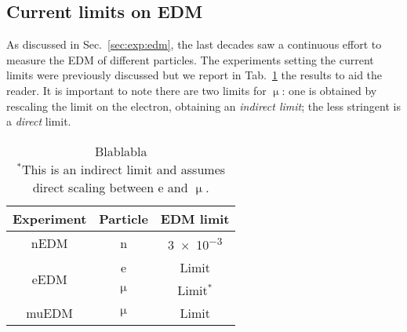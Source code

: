 \begin{refsection}
    \subsection{Current limits on EDM}
        As discussed in Sec.~\ref{sec:exp:edm}, the last decades saw a continuous effort to measure the EDM of different particles.
        The experiments setting the current limits were previously discussed but we report in Tab.~\ref{tab:edm} the results to aid the reader.
        It is important to note there are two limits for $\upmu$: one is obtained by rescaling the limit on the electron, obtaining an \textit{indirect limit}; the less stringent is a \textit{direct} limit.
        \begin{table}[]
            \centering
            \begin{tabular}{|c|c|c|}
                \hline
                Experiment & Particle & EDM limit \\
                \hline
                \hline
                nEDM & n & \SI{3e-3}{}\\
                \hline
                \multirow{2}{*}{eEDM} & e & Limit \\
                 & $\upmu$ & Limit$^*$ \\
                \hline
                muEDM & $\upmu$ & Limit \\
                \hline
            \end{tabular}
            \caption{Blablabla\\ $^*$This is an indirect limit and assumes direct scaling between e and $\upmu$.}
            \label{tab:edm}
        \end{table}


\end{refsection}
